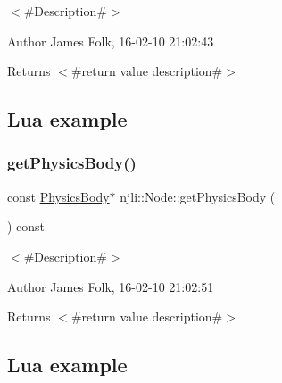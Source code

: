 $<$\#\+Description\#$>$ 

\begin{DoxyAuthor}{Author}
James Folk, 16-\/02-\/10 21\+:02\+:43
\end{DoxyAuthor}
\begin{DoxyReturn}{Returns}
$<$\#return value description\#$>$
\end{DoxyReturn}
\hypertarget{classnjli_1_1_steering_behavior_wander_ex1}{}\subsection{Lua example}\label{classnjli_1_1_steering_behavior_wander_ex1}

\begin{DoxyCodeInclude}
\end{DoxyCodeInclude}
\mbox{\label{classnjli_1_1_node_adbe8973bc62e3f5ed9c02f561bebac1e}} 
\subsubsection{\texorpdfstring{get\+Physics\+Body()}{getPhysicsBody()}\hspace{0.1cm}{\footnotesize\ttfamily [2/2]}}
{\footnotesize\ttfamily const \mbox{\hyperlink{classnjli_1_1_physics_body}{Physics\+Body}}$\ast$ njli\+::\+Node\+::get\+Physics\+Body (\begin{DoxyParamCaption}{ }\end{DoxyParamCaption}) const}



$<$\#\+Description\#$>$ 

\begin{DoxyAuthor}{Author}
James Folk, 16-\/02-\/10 21\+:02\+:51
\end{DoxyAuthor}
\begin{DoxyReturn}{Returns}
$<$\#return value description\#$>$
\end{DoxyReturn}
\hypertarget{classnjli_1_1_steering_behavior_wander_ex1}{}\subsection{Lua example}\label{classnjli_1_1_steering_behavior_wander_ex1}

\begin{DoxyCodeInclude}
\end{DoxyCodeInclude}
\mbox{\label{classnjli_1_1_node_adc880f00ca477aa26851b783ebd4dfe8}} 
